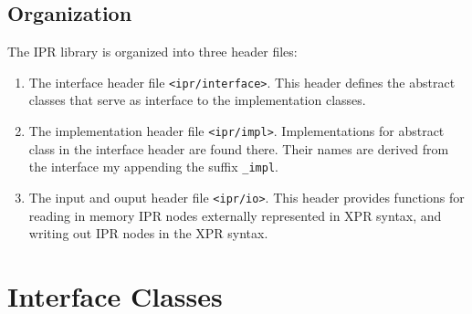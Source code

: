 \documentclass[letter,11pt]{article}
\begin{document}








\subsection{Organization}
\label{sec:intro:organization}

The IPR library is organized into three header files:
\begin{enumerate}
\item The interface header file \texttt{<ipr/interface>}.  This header defines
  the abstract classes that serve as interface to the implementation classes.

\item The implementation header file \texttt{<ipr/impl>}. 
  Implementations for abstract class in the interface header are found
  there.  Their names are derived from the interface my appending the
  suffix \texttt{\_impl}.

\item The input and ouput header file \texttt{<ipr/io>}.  This header provides
  functions for reading in memory IPR nodes externally represented in XPR
  syntax, and  writing out IPR nodes in the XPR syntax.
\end{enumerate}


\section{Interface Classes}
\label{sec:interface-classes}
\end{document}

